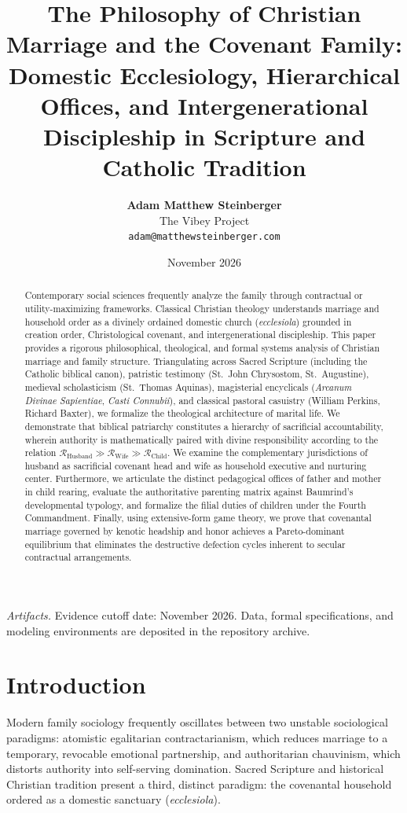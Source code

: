 \documentclass[11pt,twocolumn]{article}
\title{\textbf{The Philosophy of Christian Marriage and the Covenant Family: Domestic Ecclesiology, Hierarchical Offices, and Intergenerational Discipleship in Scripture and Catholic Tradition}}
\author{\textbf{Adam Matthew Steinberger}\\
The Vibey Project\\
\texttt{adam@matthewsteinberger.com}}
\date{November 2026}
\begin{document}
\maketitle

\begin{abstract}
Contemporary social sciences frequently analyze the family through contractual or utility-maximizing frameworks. Classical Christian theology understands marriage and household order as a divinely ordained domestic church (\textit{ecclesiola}) grounded in creation order, Christological covenant, and intergenerational discipleship. This paper provides a rigorous philosophical, theological, and formal systems analysis of Christian marriage and family structure. Triangulating across Sacred Scripture (including the Catholic biblical canon), patristic testimony (St.~John Chrysostom, St.~Augustine), medieval scholasticism (St.~Thomas Aquinas), magisterial encyclicals (\textit{Arcanum Divinae Sapientiae}, \textit{Casti Connubii}), and classical pastoral casuistry (William Perkins, Richard Baxter), we formalize the theological architecture of marital life. We demonstrate that biblical patriarchy constitutes a hierarchy of sacrificial accountability, wherein authority is mathematically paired with divine responsibility according to the relation $\mathcal{R}_{\text{Husband}} \gg \mathcal{R}_{\text{Wife}} \gg \mathcal{R}_{\text{Child}}$. We examine the complementary jurisdictions of husband as sacrificial covenant head and wife as household executive and nurturing center. Furthermore, we articulate the distinct pedagogical offices of father and mother in child rearing, evaluate the authoritative parenting matrix against Baumrind's developmental typology, and formalize the filial duties of children under the Fourth Commandment. Finally, using extensive-form game theory, we prove that covenantal marriage governed by kenotic headship and honor achieves a Pareto-dominant equilibrium that eliminates the destructive defection cycles inherent to secular contractual arrangements.
\end{abstract}

\noindent\textit{Artifacts.} Evidence cutoff date: November 2026. Data, formal specifications, and modeling environments are deposited in the repository archive.

\section{Introduction}
Modern family sociology frequently oscillates between two unstable sociological paradigms: atomistic egalitarian contractarianism, which reduces marriage to a temporary, revocable emotional partnership, and authoritarian chauvinism, which distorts authority into self-serving domination. Sacred Scripture and historical Christian tradition present a third, distinct paradigm: the covenantal household ordered as a domestic sanctuary (\textit{ecclesiola}).
\end{document}
